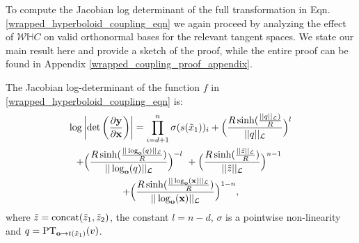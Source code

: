 
To compute the Jacobian log determinant of the full transformation in Eqn. \ref{wrapped_hyperboloid_coupling_eqn} we again proceed by analyzing the effect of $\mathcal{W}\mathbb{H}C$ on valid orthonormal bases for the relevant tangent spaces. We state our main result here and provide a sketch of the proof, while the entire proof can be found in Appendix \ref{wrapped_coupling_proof_appendix}. 
\begin{prop}
The Jacobian log-determinant of the function $f$ in \eqref{wrapped_hyperboloid_coupling_eqn} is:
\begin{multline}
  \log \left|\textnormal{det}\left(\frac{\partial\mb{y}}{\partial \mb{x}}\right)\right| = \prod_{i=d+1}^n\sigma(s(\tilde{x}_1))_i + \Big(\frac{R \sinh(\frac{||q||_{\mathcal{L}})}{R}}{||q||_{\mathcal{L}}}\Big)^{l} \\
  + \Big(\frac{R\sinh(\frac{||\log_{\textbf{o}}(q)||_{\mathcal{L}}}{R})}{||\log_{\textbf{o}}(q)||_{\mathcal{L}}}\Big)^{-l} \ +  \Big(\frac{R\sinh(\frac{||\tilde{z}||_{\mathcal{L}}}{R})}{||\tilde{z}||_{\mathcal{L}}}\Big)^{n-1}
 \  \\ + \Big(\frac{R\sinh(\frac{||\log_{\textbf{o}}(\textbf{x})||_{\mathcal{L}}}{R})}{||\log_{\textbf{o}}(\textbf{x})||_{\mathcal{L}}}\Big)^{1-n},
\end{multline}
where $\tilde{z} = \textnormal{concat}(\tilde{z}_1, \tilde{z}_2)$, the constant $l = n-d$, $\sigma$ is a pointwise non-linearity 
and $q = \textnormal{PT}_{\textbf{o}\to t(\tilde{x}_1) }(v)$.
\end{prop}
